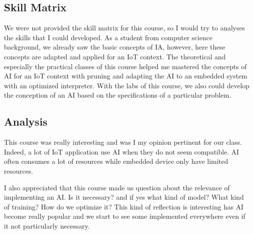 \subsection{Skill Matrix}

We were not provided the skill matrix for this course, so I would try to analyses the skills that I could developed. As a student from computer science background, we already saw the basic concepts of IA, however, here these concepts are adapted and applied for an IoT context. The theoretical and especially the practical classes of this course helped me mastered the concepts of AI for an IoT context with pruning and adapting the AI to an embedded system with an optimized interpreter. With the labs of this course, we also could develop the conception of an AI based on the specifications of a particular problem. 

\subsection{Analysis}

This course was really interesting and was I my opinion pertinent for our class. Indeed, a lot of IoT application use AI when they do not seem compatible. AI often consumes a lot of resources while embedded device only have limited resources.

I also appreciated that this course made us question about the relevance of implementing an AI. Is it necessary? and if yes what kind of model? What kind of training? How do we optimize it? This kind of reflection is interesting has AI become really popular and we start to see some implemented everywhere even if it not particularly necessary.